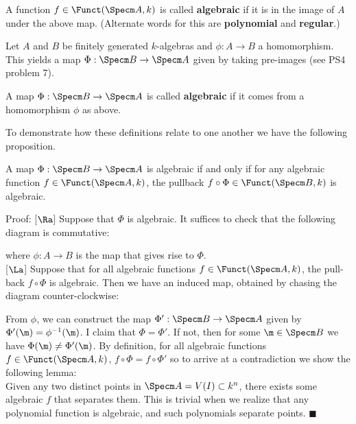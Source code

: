 \documentclass[10 pt]{article}
\newtheorem{cor}{Corollary}[section]
\newtheorem{lem}{Lemma}[section]
\newtheorem{prop}{Proposition}[section]
\newtheorem{propconstr}{Proposition-Construction}[section]
\newcommand\begin{lemma}{\begin{lem}}
\newcommand\begin{proposition}{\begin{prop}}
\newcommand\begin{proof}{\begin{proof}}
\newcommand\begin{corollary}{\begin{cor}}
\newcommand\begin{proposition}constr{\begin{propconstr}}
\newcommand\end{definition}{\end{defn}}
\newcommand\end{lemma}{\end{lem}}
\newcommand\end{corollary}{\end{cor}}
\newcommand\end{proposition}{\end{prop}}
\newcommand\end{proof}{\end{proof}}
\newcommand\end{proposition}constr{\end{propconstr}}
\begin{document}
\begin{definition} A function $f\in \Funct(\Specm A,k)$ is called {\bf algebraic} if it is in the image of $A$ under the above map.  (Alternate words for this are {\bf polynomial} and {\bf regular}.) \end{definition}

Let $A$ and $B$ be finitely generated $k$-algebras and $\phi:A\rightarrow B$ a homomorphism.  This yields a map $\Phi:\Specm B\rightarrow \Specm A$ given by taking pre-images (see PS4 problem 7).

\begin{definition} A map $\Phi:\Specm B\rightarrow \Specm A$ is called {\bf algebraic} if it comes from a homomorphism $\phi$ as above.\end{definition}

To demonstrate how these definitions relate to one another we have the following proposition.

\begin{proposition} A map $\Phi:\Specm B\rightarrow \Specm A$ is algebraic if and only if for any algebraic function $f\in \Funct(\Specm A,k)$, the pullback $f\circ \Phi\in \Funct(\Specm B,k)$ is algebraic.\end{proposition}

Proof:  [$\Ra$] Suppose that $\Phi$ is algebraic.  It suffices to check that the following diagram is commutative:\\


where $\phi:A\rightarrow B$ is the map that gives rise to $\Phi$.\\

[$\La$] Suppose that for all algebraic functions $f\in \Funct(\Specm A,k)$, the pull-back $f\circ\Phi$ is algebraic.  Then we have an induced map, obtained by chasing the diagram counter-clockwise:


From $\phi$, we can construct the map $\Phi':\Specm B \rightarrow \Specm A$ given by $\Phi'(\m)=\phi^{-1}(\m)$.  I claim that $\Phi=\Phi'$.  If not, then for some $\m\in \Specm B$ we have $\Phi(\m)\neq \Phi'(\m)$.  By definition, for all algebraic functions $f\in \Funct(\Specm A,k)$, $f\circ\Phi=f\circ\Phi'$ so to arrive at a contradiction we show the following lemma:\\
Given any two distinct points in $\Specm A=V(I)\subset k^n$, there exists some algebraic $f$ that separates them.  This is trivial when we realize that any polynomial function is algebraic, and such polynomials separate points.  $\blacksquare$
\end{document}
